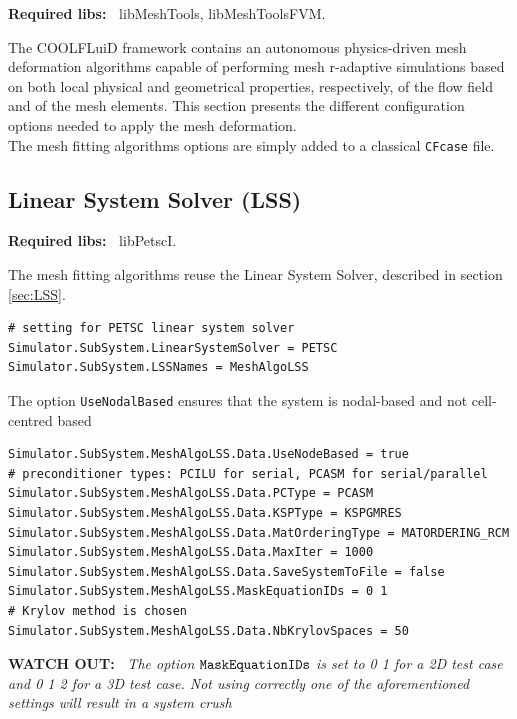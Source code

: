 \documentclass[11pt]{article}
\begin{document}
{\bf Required libs:~} libMeshTools, libMeshToolsFVM.

The COOLFLuiD framework contains an autonomous physics-driven mesh deformation algorithms capable of performing mesh r-adaptive simulations based on both local physical and geometrical properties, respectively, of the flow field and of the mesh elements. This section presents the different configuration options needed to apply the mesh deformation.\\
The mesh fitting algorithms options are simply added to a classical {\tt CFcase} file.

\subsection{Linear System Solver (LSS)}
{\bf Required libs:~} libPetscI.

The mesh fitting algorithms reuse the Linear System Solver, described in section \ref{sec:LSS}. 

\begin{lstlisting}[breaklines]
# setting for PETSC linear system solver
Simulator.SubSystem.LinearSystemSolver = PETSC
Simulator.SubSystem.LSSNames = MeshAlgoLSS
\end{lstlisting}
The option {\tt UseNodalBased} ensures that the system is nodal-based and not cell-centred based
\begin{lstlisting}[breaklines]
Simulator.SubSystem.MeshAlgoLSS.Data.UseNodeBased = true
# preconditioner types: PCILU for serial, PCASM for serial/parallel
Simulator.SubSystem.MeshAlgoLSS.Data.PCType = PCASM
Simulator.SubSystem.MeshAlgoLSS.Data.KSPType = KSPGMRES
Simulator.SubSystem.MeshAlgoLSS.Data.MatOrderingType = MATORDERING_RCM
Simulator.SubSystem.MeshAlgoLSS.Data.MaxIter = 1000
Simulator.SubSystem.MeshAlgoLSS.Data.SaveSystemToFile = false
Simulator.SubSystem.MeshAlgoLSS.MaskEquationIDs = 0 1
# Krylov method is chosen 
Simulator.SubSystem.MeshAlgoLSS.Data.NbKrylovSpaces = 50
\end{lstlisting}

{\bf WATCH OUT:~} {\it The option $\tt{MaskEquationIDs}$ is set to 0 1 for a 2D test case and 0 1 2 for a 3D test case. Not using correctly one of the aforementioned settings will result in a system crush}
\end{document}
